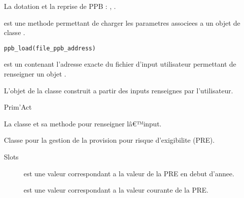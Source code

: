 \documentclass[a4paper]{book}
\begin{document}
%
\begin{SeeAlso}\relax
La dotation et la reprise de PPB : , .
\end{SeeAlso}
%
\begin{Description}\relax
{} est une methode permettant de charger les parametres associees a un
objet de classe .
\end{Description}
%
\begin{Usage}
\begin{verbatim}
ppb_load(file_ppb_address)
\end{verbatim}
\end{Usage}
%
\begin{Arguments}
\begin{ldescription}
\item[\code{file\_ppb\_address}] est un  contenant l'adresse exacte
du fichier d'input utilisateur
permettant de renseigner un objet .
\end{ldescription}
\end{Arguments}
%
\begin{Value}
L'objet de la classe  construit a partir des inputs renseignes par l'utilisateur.
\end{Value}
%
\begin{Author}\relax
Prim'Act
\end{Author}
%
\begin{SeeAlso}\relax
La classe  et sa methode 
pour renseigner lâ€™input.
\end{SeeAlso}
%
\begin{Description}\relax
Classe pour la gestion de la provision pour risque d'exigibilite (PRE).
\end{Description}
%
\begin{Section}{Slots}

\begin{description}

\item[] est une valeur  correspondant a la valeur de la PRE en debut d'annee.

\item[] est une valeur  correspondant a la valeur courante de la PRE.

\end{description}
\end{Section}
\end{document}
